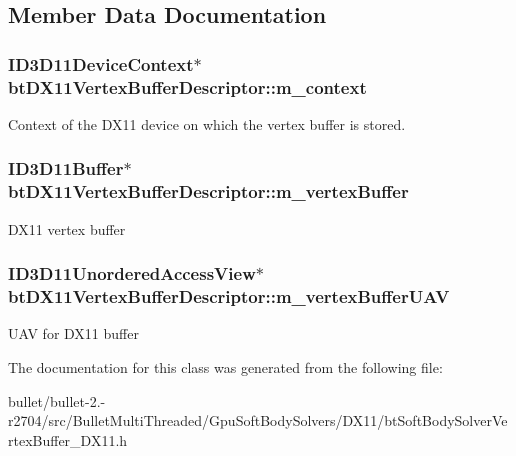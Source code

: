 \subsection{Member Data Documentation}
\hypertarget{classbt_d_x11_vertex_buffer_descriptor_a31bcee68cd2fd39a374ddf10925d8595}{
\subsubsection[{m\+\_\+context}]{\setlength{\rightskip}{0pt plus 5cm}I\+D3\+D11\+Device\+Context$\ast$ bt\+D\+X11\+Vertex\+Buffer\+Descriptor\+::m\+\_\+context\hspace{0.3cm}{\ttfamily [protected]}}}\label{classbt_d_x11_vertex_buffer_descriptor_a31bcee68cd2fd39a374ddf10925d8595}
Context of the D\+X11 device on which the vertex buffer is stored. \hypertarget{classbt_d_x11_vertex_buffer_descriptor_a29c0bf57f93456ad4eab166d55e50546}{
\subsubsection[{m\+\_\+vertex\+Buffer}]{\setlength{\rightskip}{0pt plus 5cm}I\+D3\+D11\+Buffer$\ast$ bt\+D\+X11\+Vertex\+Buffer\+Descriptor\+::m\+\_\+vertex\+Buffer\hspace{0.3cm}{\ttfamily [protected]}}}\label{classbt_d_x11_vertex_buffer_descriptor_a29c0bf57f93456ad4eab166d55e50546}
D\+X11 vertex buffer \hypertarget{classbt_d_x11_vertex_buffer_descriptor_a583e863d100a338649a9186eee43c761}{
\subsubsection[{m\+\_\+vertex\+Buffer\+U\+A\+V}]{\setlength{\rightskip}{0pt plus 5cm}I\+D3\+D11\+Unordered\+Access\+View$\ast$ bt\+D\+X11\+Vertex\+Buffer\+Descriptor\+::m\+\_\+vertex\+Buffer\+U\+A\+V\hspace{0.3cm}{\ttfamily [protected]}}}\label{classbt_d_x11_vertex_buffer_descriptor_a583e863d100a338649a9186eee43c761}
U\+A\+V for D\+X11 buffer 

The documentation for this class was generated from the following file\+:\begin{DoxyCompactItemize}
\item 
bullet/bullet-\/2.-\/r2704/src/\+Bullet\+Multi\+Threaded/\+Gpu\+Soft\+Body\+Solvers/\+D\+X11/bt\+Soft\+Body\+Solver\+Vertex\+Buffer\+\_\+\+D\+X11.\+h\end{DoxyCompactItemize}
